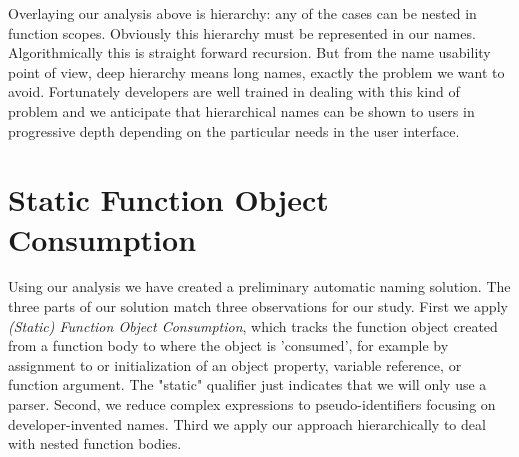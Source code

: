 \documentclass[10pt, preprint]{sigplanconf}
\begin{document}
Overlaying our analysis above is hierarchy: any of the cases can be nested in function scopes. Obviously this hierarchy must be represented in our names. Algorithmically this is straight forward recursion. But from the name usability point of view, deep hierarchy means long names, exactly the problem we want to avoid. Fortunately developers are well trained in dealing with this kind of problem and we anticipate  that hierarchical names can be shown to users in progressive depth depending on the particular needs in the user interface.



\section{Static  Function Object Consumption}
Using our analysis we have created a preliminary automatic naming solution.  The three parts of our solution match three observations for our study. First we apply 
 \textit{(Static) Function Object Consumption}, which tracks the function object created from a function body to where the object is 'consumed', for example by assignment to or initialization of  an object property, variable reference, or function argument. The "static" qualifier just indicates that we will only use a parser.  Second, we reduce complex expressions to pseudo-identifiers focusing on developer-invented names.  Third we apply our approach hierarchically to  deal with nested function bodies.
\end{document}
